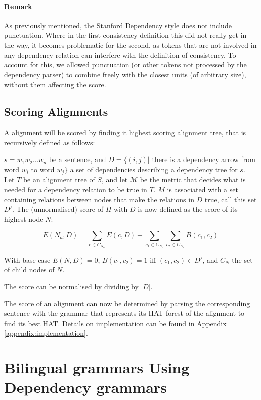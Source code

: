 \paragraph{Remark} As previously mentioned, the Stanford Dependency style does not include punctuation. Where in the first consistency definition this did not really get in the way, it becomes problematic for the second, as tokens that are not involved in any dependency relation can interfere with the definition of consistency. To account for this, we allowed punctuation (or other tokens not processed by the dependency parser) to combine freely with the closest units (of arbitrary size), without them affecting the score.

\subsection{Scoring Alignments}

A alignment will be scored by finding it highest scoring alignment tree, that is recursively defined as follows:

\begin{definition}
 $s = w_1 w_2 \dots w_n$ be a sentence, and $D = \{ (i,j) |$ there is a dependency arrow from word $w_i$ to word $w_j \}$ a set of dependencies describing a dependency tree for $s$. Let $T$ be an alignment tree of $S$, and let $\mathcal{M}$ be the metric that decides what is needed for a dependency relation to be true in $T$. $M$ is associated with a set containing relations between nodes that make the relations in $D$ true, call this set $D'$. The (unnormalised) score of $H$ with $D$ is now defined as the score of its highest node $N$:

$$
E(N_a,D) = \sum_{c\in C_{N_a}} E(c,D)+ \sum_{c_1\in C_{N_a}} \sum_{c_2\in C_{N_a}} B(c_1,c_2)
$$

\noindent With base case $E(N,D) = 0$, $B(c_1,c_2) = 1$ iff  $(c_1,c_2)\in D'$, and $C_N$ the set of child nodes of $N$.

The score can be normalised by dividing by $|D|$.
\end{definition}

The score of an alignment can now be determined by parsing the corresponding sentence with the grammar that represents its HAT forest of the alignment to find its best HAT. Details on implementation can be found in Appendix \ref{appendix:implementation}.

\section{Bilingual grammars Using Dependency grammars}
\label{sec:em}

